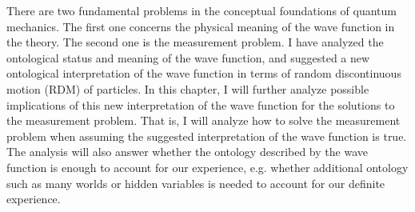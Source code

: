 


There are two fundamental problems in the conceptual foundations of quantum mechanics. The first one concerns the physical meaning of the wave function in the theory. The second one is the measurement problem. 
I have analyzed the ontological status and meaning of the wave function, and suggested a new ontological  interpretation of the wave function in terms of random discontinuous motion (RDM) of particles. 
In this chapter, I will further analyze possible implications of this new interpretation of the wave function for the solutions to the measurement problem. That is, I will analyze how to solve the measurement problem when assuming the suggested interpretation of the wave function is true.
The analysis will also answer whether the ontology described by the wave function is enough to account for our experience, e.g. whether additional ontology such as many worlds or hidden variables is needed to account for our definite experience.

